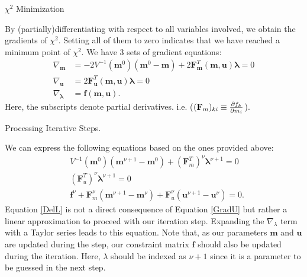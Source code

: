 \documentclass[
	xcolor=dvipsnames,
	10pt, 
	]{beamer}
\begin{document}
\begin{frame}{$\chi^2$ Minimization}
	\begin{block}{}
		By (partially)differentiating with respect to all variables involved, we obtain the gradients of $\chi^2$. Setting all of them to zero indicates that we have reached a minimum point of $\chi^2$. We have 3 sets of gradient equations:
		\begin{align}
			\nabla_{\mathbf m} &= -2 V^{-1}(\mathbf m^0)(\mathbf m^0-\mathbf m) + 2 \mathbf F_\mathbf m^T(\mathbf{m,u})\mathbf\lambda=0\label{GradM}\\
			\nabla_{\mathbf u} &= 2\mathbf F_\mathbf u^T(\mathbf{m,u})\mathbf \lambda =0\label{GradU}\\
			\nabla_{\mathbf \lambda}& = \mathbf f(\mathbf{m,u})\label{GradL}.
		\end{align}
		Here, the subscripts denote partial derivatives. i.e. ($(\mathbf {F}_m)_{ki}\equiv\frac{\partial f_k}{\partial m_i}$).
	\end{block}
\end{frame}
\begin{frame}{Processing Iterative Steps.}
	\begin{block}{}
		We can express the following equations based on the ones provided above:
		\begin{align}
			&V^{-1}(\mathbf m^0)(\mathbf{m}^{\nu+1}-\mathbf{m}^0)+(\mathbf{F}_m^T)^\nu\mathbf\lambda^{\nu+1}=0\label{DelM}\\
			&(\mathbf{F}_u^T)^\nu\mathbf\lambda^{\nu+1}=0\label{DelU}\\
			&\mathbf f^\nu + \mathbf F^\nu_m (\mathbf m^{\nu+1}-\mathbf m^\nu) + \mathbf F^\nu_u(\mathbf u^{\nu+1}-\mathbf u^\nu)=0\label{DelL}.
		\end{align}
		Equation \eqref{DelL} is not a direct consequence of Equation \eqref{GradU} but rather a linear approximation to proceed with our iteration step. Expanding the $\nabla_\lambda$ term with a Taylor series leads to this equation. 
		Note that, as our parameters $\mathbf m$ and $\mathbf u$ are updated during the step, our constraint matrix $\mathbf f$ should also be updated during the iteration. Here, $\lambda$ should be indexed as $\nu+1$ since it is a parameter to be guessed in the next step.
	\end{block}
\end{frame}
\end{document}
